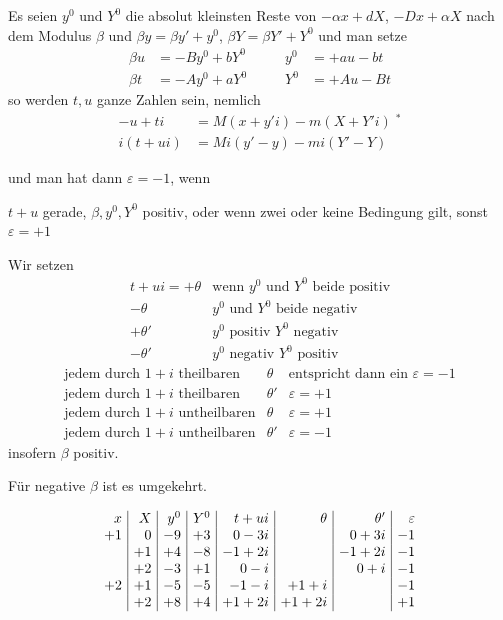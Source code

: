 Es seien $y^0$ und $Y^0$ die absolut kleinsten Reste von $-\alpha x+dX$, $-Dx+\alpha X$ nach dem Modulus $\beta$ und $\beta y=\beta y'+y^0$, $\beta Y=\beta Y'+Y^0$ und man setze
\[
\begin{alignedat}{2}
\beta u&=-By^0+bY^0\qquad&y^0&=+au-bt\\
\beta t&=-Ay^0+aY^0&Y^0&=+Au-Bt
\end{alignedat}
\]
so werden $t,u$ ganze Zahlen sein, nemlich
\[
\begin{aligned}
-u+ti&=M(x+y'i)-m(X+Y'i)\;{}^*\\
i(t+ui)&=Mi(y'-y)-mi(Y'-Y)
\end{aligned}
\]

und man hat dann $\varepsilon=-1$, wenn\par
\noindent $t+u$ gerade, $\beta,y^0,Y^0$ positiv, oder wenn zwei oder keine Bedingung gilt, sonst $\varepsilon=+1$\par
Wir setzen
\[
\begin{array}{rl}
t+ui=+\theta&\text{wenn }y^0\text{ und }Y^0\text{ beide positiv}\\
-\theta&y^0\text{ und }Y^0\text{ beide negativ}\\
+\theta'&y^0\text{ positiv }Y^0\text{ negativ}\\
-\theta'&y^0\text{ negativ }Y^0\text{ positiv}
\end{array}
\]
\[
\begin{array}{llr}
\text{jedem durch }1+i\text{ theilbaren}&\theta&\text{entspricht dann ein }\varepsilon=-1\\
\text{jedem durch }1+i\text{ theilbaren}&\theta'&\varepsilon=+1\\
\text{jedem durch }1+i\text{ untheilbaren}&\theta&\varepsilon=+1\\
\text{jedem durch }1+i\text{ untheilbaren}&\theta'&\varepsilon=-1
\end{array}
\]
insofern $\beta$ positiv.\par
Für negative $\beta$ ist es umgekehrt.

%
\[
\setlength{\arraycolsep}{4pt}
\begin{array}{r|r|r|r|r|r|r|r}
x&X&y^0&Y^0&t+ui&\theta&\theta'&\varepsilon\\
+1&0&-9&+3&0-3i&&0+3i&-1\\
&+1&+4&-8&-1+2i&&-1+2i&-1\\
&+2&-3&+1&0-i&&0+i&-1\\
+2&+1&-5&-5&-1-i&+1+i&&-1\\
&+2&+8&+4&+1+2i&+1+2i&&+1
\end{array}
\]

